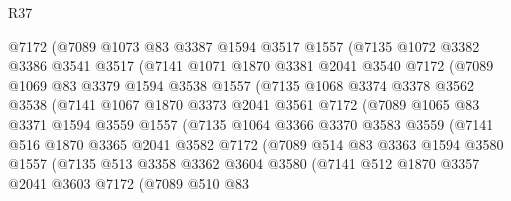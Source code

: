 \begin{lexlean}{R37}
\begin{coremodule}
            @7172
            (@7089
              @1073
              @83
              @3387
              @1594
              @3517
              @1557
              (@7135
                @1072
                @3382
                @3386
                @3541
                @3517
                (@7141
                  @1071
                  @1870
                  @3381
                  @2041
                  @3540
                  @7172
                  (@7089
                    @1069
                    @83
                    @3379
                    @1594
                    @3538
                    @1557
                    (@7135
                      @1068
                      @3374
                      @3378
                      @3562
                      @3538
                      (@7141
                        @1067
                        @1870
                        @3373
                        @2041
                        @3561
                        @7172
                        (@7089
                          @1065
                          @83
                          @3371
                          @1594
                          @3559
                          @1557
                          (@7135
                            @1064
                            @3366
                            @3370
                            @3583
                            @3559
                            (@7141
                              @516
                              @1870
                              @3365
                              @2041
                              @3582
                              @7172
                              (@7089
                                @514
                                @83
                                @3363
                                @1594
                                @3580
                                @1557
                                (@7135
                                  @513
                                  @3358
                                  @3362
                                  @3604
                                  @3580
                                  (@7141
                                    @512
                                    @1870
                                    @3357
                                    @2041
                                    @3603
                                    @7172
                                    (@7089
                                      @510
                                      @83

\end{coremodule}
\end{lexlean}
